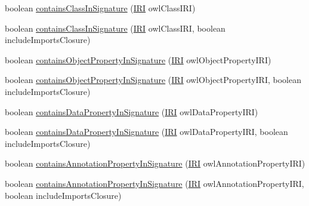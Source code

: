 \begin{DoxyCompactItemize}
\item 
boolean \hyperlink{interfaceorg_1_1semanticweb_1_1owlapi_1_1model_1_1_o_w_l_ontology_a5d286367aeb3cc31c9b840d7b0c07871}{contains\-Class\-In\-Signature} (\hyperlink{classorg_1_1semanticweb_1_1owlapi_1_1model_1_1_i_r_i}{I\-R\-I} owl\-Class\-I\-R\-I)
\item 
boolean \hyperlink{interfaceorg_1_1semanticweb_1_1owlapi_1_1model_1_1_o_w_l_ontology_a9e0161c2bb1dfa4abc45a79959ba55ed}{contains\-Class\-In\-Signature} (\hyperlink{classorg_1_1semanticweb_1_1owlapi_1_1model_1_1_i_r_i}{I\-R\-I} owl\-Class\-I\-R\-I, boolean include\-Imports\-Closure)
\item 
boolean \hyperlink{interfaceorg_1_1semanticweb_1_1owlapi_1_1model_1_1_o_w_l_ontology_aa86ff738bd5f9767190dc5c1f1cf545b}{contains\-Object\-Property\-In\-Signature} (\hyperlink{classorg_1_1semanticweb_1_1owlapi_1_1model_1_1_i_r_i}{I\-R\-I} owl\-Object\-Property\-I\-R\-I)
\item 
boolean \hyperlink{interfaceorg_1_1semanticweb_1_1owlapi_1_1model_1_1_o_w_l_ontology_a1a9351fc8343c78733f1264e62610d41}{contains\-Object\-Property\-In\-Signature} (\hyperlink{classorg_1_1semanticweb_1_1owlapi_1_1model_1_1_i_r_i}{I\-R\-I} owl\-Object\-Property\-I\-R\-I, boolean include\-Imports\-Closure)
\item 
boolean \hyperlink{interfaceorg_1_1semanticweb_1_1owlapi_1_1model_1_1_o_w_l_ontology_ac7147719522e230ce76d3f936899a5f4}{contains\-Data\-Property\-In\-Signature} (\hyperlink{classorg_1_1semanticweb_1_1owlapi_1_1model_1_1_i_r_i}{I\-R\-I} owl\-Data\-Property\-I\-R\-I)
\item 
boolean \hyperlink{interfaceorg_1_1semanticweb_1_1owlapi_1_1model_1_1_o_w_l_ontology_a23ec00c4719cbb40c41095bdfcdfa9ee}{contains\-Data\-Property\-In\-Signature} (\hyperlink{classorg_1_1semanticweb_1_1owlapi_1_1model_1_1_i_r_i}{I\-R\-I} owl\-Data\-Property\-I\-R\-I, boolean include\-Imports\-Closure)
\item 
boolean \hyperlink{interfaceorg_1_1semanticweb_1_1owlapi_1_1model_1_1_o_w_l_ontology_a4c9310943a436bd6b39e9d0e98a9bc9e}{contains\-Annotation\-Property\-In\-Signature} (\hyperlink{classorg_1_1semanticweb_1_1owlapi_1_1model_1_1_i_r_i}{I\-R\-I} owl\-Annotation\-Property\-I\-R\-I)
\item 
boolean \hyperlink{interfaceorg_1_1semanticweb_1_1owlapi_1_1model_1_1_o_w_l_ontology_a1df75a8328af41656a9fd97149f20bd8}{contains\-Annotation\-Property\-In\-Signature} (\hyperlink{classorg_1_1semanticweb_1_1owlapi_1_1model_1_1_i_r_i}{I\-R\-I} owl\-Annotation\-Property\-I\-R\-I, boolean include\-Imports\-Closure)

\end{DoxyCompactItemize}
